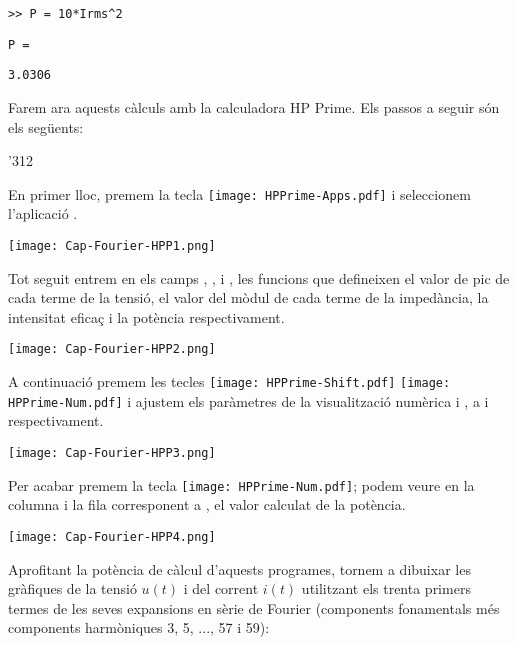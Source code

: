 \begin{exemple}
    \hspace{1cm}\texttt{>{}> P = 10*Irms\^{}2}

    \hspace{1cm}\texttt{P =}

    \hspace{1cm}\texttt{\phantom{Irms }3.0306}\newline


    Farem ara aquests càlculs amb la calculadora \textsf{HP Prime}.
     Els passos a seguir són els següents:

    \begin{dingautolist}{'312}

        \item En primer lloc, premem la tecla \texttt{[image: HPPrime-Apps.pdf]} i seleccionem l'aplicació .

             \texttt{[image: Cap-Fourier-HPP1.png]}

        \item Tot seguit entrem en els camps , ,  i , les funcions que defineixen el valor de pic de cada terme de la tensió,  el valor del mòdul de cada terme de la impedància,  la intensitat eficaç i la potència respectivament.

            \texttt{[image: Cap-Fourier-HPP2.png]}

        \item  A continuació premem les tecles \texttt{[image: HPPrime-Shift.pdf]} \texttt{[image: HPPrime-Num.pdf]} i ajustem els paràmetres de la visualització numèrica  i , a  i  respectivament.

            \texttt{[image: Cap-Fourier-HPP3.png]}

        \item Per acabar premem la tecla \texttt{[image: HPPrime-Num.pdf]}; podem veure en la columna  i la fila corresponent a , el valor calculat de la potència.

            \texttt{[image: Cap-Fourier-HPP4.png]}

    \end{dingautolist}

    Aprofitant la potència de càlcul d'aquests programes, tornem a dibuixar les gràfiques de la tensió $u(t)$ i del corrent $i(t)$ utilitzant els trenta primers termes de les seves expansions en sèrie de Fourier (components fonamentals més components harmòniques 3, 5, ..., 57 i 59):
    \vspace{-2mm}
    \begin{center}
      
    \end{center}


\end{exemple}
